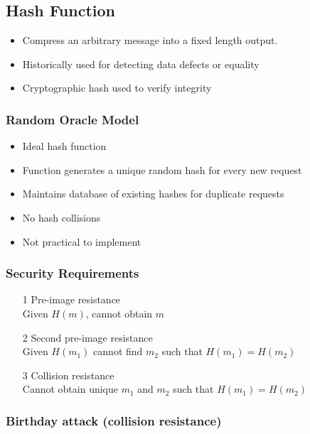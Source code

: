 \documentclass[a4paper]{article}
\begin{document}
\subsection{Hash Function}

\begin{itemize}
  \item Compress an arbitrary message into a fixed length output.
  \item Historically used for detecting data defects or equality
  \item Cryptographic hash used to verify integrity
\end{itemize}

\subsubsection{Random Oracle Model}

\begin{itemize}
  \item Ideal hash function
  \item Function generates a unique random hash for every new request
  \item Maintains database of existing hashes for duplicate requests
  \item No hash collisions
  \item Not practical to implement
\end{itemize}

\subsubsection{Security Requirements}

\begin{enumerate}
  \item[1]
    Pre-image resistance \\
    Given $H(m)$, cannot obtain $m$
  \item[2]
    Second pre-image resistance \\
    Given $H(m_{1})$ cannot find $m_{2}$ such that $H(m_{1}) = H(m_{2})$
  \item[3]
    Collision resistance \\
    Cannot obtain unique $m_{1}$ and $m_{2}$ such that $H(m_{1}) = H(m_{2})$
\end{enumerate}

\subsubsection{Birthday attack (collision resistance)}
\end{document}
